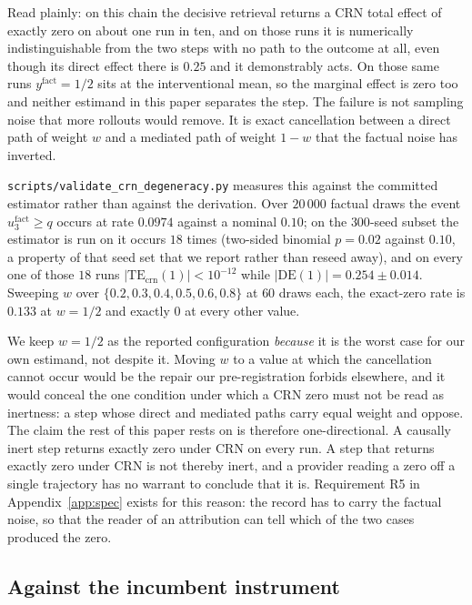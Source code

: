 \documentclass[11pt]{article}
\theoremstyle{remark}
\newcommand{\TEcrn}{\mathrm{TE}_{\mathrm{crn}}}
\newcommand{\DE}{\mathrm{DE}}
\begin{document}
Read plainly: on this chain the decisive retrieval returns a CRN total effect of
exactly zero on about one run in ten, and on those runs it is numerically
indistinguishable from the two steps with no path to the outcome at all, even
though its direct effect there is $0.25$ and it demonstrably acts. On those same
runs $y^{\mathrm{fact}} = 1/2$ sits at the interventional mean, so the marginal
effect is zero too and neither estimand in this paper separates the step. The
failure is not sampling noise that more rollouts would remove. It is exact
cancellation between a direct path of weight $w$ and a mediated path of weight
$1-w$ that the factual noise has inverted.

\texttt{scripts/validate\_crn\_degeneracy.py} measures this against the committed
estimator rather than against the derivation. Over $20\,000$ factual draws the
event $u_3^{\mathrm{fact}} \ge q$ occurs at rate $0.0974$ against a nominal
$0.10$; on the $300$-seed subset the estimator is run on it occurs $18$ times
(two-sided binomial $p = 0.02$ against $0.10$, a property of that seed set that
we report rather than reseed away), and on every one of those $18$ runs
$|\TEcrn(1)| < 10^{-12}$ while $|\DE(1)| = 0.254 \pm 0.014$. Sweeping $w$ over
$\{0.2, 0.3, 0.4, 0.5, 0.6, 0.8\}$ at $60$ draws each, the exact-zero rate is
$0.133$ at $w = 1/2$ and exactly $0$ at every other value.

We keep $w = 1/2$ as the reported configuration \emph{because} it is the worst
case for our own estimand, not despite it. Moving $w$ to a value at which the
cancellation cannot occur would be the repair our pre-registration forbids
elsewhere, and it would conceal the one condition under which a CRN zero must
not be read as inertness: a step whose direct and mediated paths carry equal
weight and oppose. The claim the rest of this paper rests on is therefore
one-directional. A causally inert step returns exactly zero under CRN on every
run. A step that returns exactly zero under CRN is not thereby inert, and a
provider reading a zero off a single trajectory has no warrant to conclude that
it is. Requirement R5 in Appendix~\ref{app:spec} exists for this reason: the
record has to carry the factual noise, so that the reader of an attribution can
tell which of the two cases produced the zero.

\subsection{Against the incumbent instrument}
\label{sec:vs-car}
\end{document}
